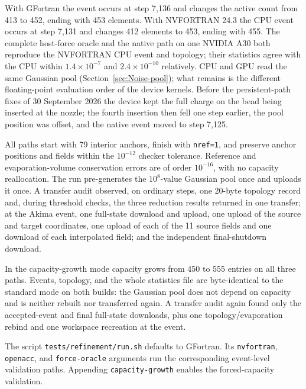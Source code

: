 With GFortran the event occurs at step 7,136 and changes the active count from
413 to 452, ending with 453 elements. With NVFORTRAN 24.3 the CPU event occurs
at step 7,131 and changes 412 elements to 453, ending with 455. The complete
host-force oracle and the native path on one NVIDIA A30 both reproduce the
NVFORTRAN CPU event and topology; their statistics agree with the CPU within
$1.4\times10^{-7}$ and $2.4\times10^{-10}$ relatively.  CPU and GPU read the
same Gaussian pool (Section~\ref{sec:Noise-pool}); what remains is the
different floating-point evaluation order of the device kernels.  Before the persistent-path
fixes of 30 September 2026 the device kept the full charge on the bead being
inserted at the nozzle; the fourth insertion then fell one step earlier, the
pool position was offset, and the native event moved to step 7,125.

All paths start with 79 interior anchors, finish with \texttt{nref=1}, and
preserve anchor positions and fields within the $10^{-12}$ checker tolerance.
Reference and evaporation-volume conservation errors are of order
$10^{-16}$, with no capacity reallocation. The run pre-generates the
$10^{8}$-value Gaussian pool once and uploads it once. A transfer audit
observed, on ordinary steps, one 20-byte topology record and, during
threshold checks, the three reduction results returned in one transfer; at
the Akima event, one full-state download and
upload, one upload of the source and target coordinates, one upload of each
of the 11 source fields and one download of each interpolated field; and the
independent final-shutdown download.

In the capacity-growth mode capacity grows from 450 to 555 entries on all
three paths. Events,
topology, and the whole statistics file are byte-identical to the standard
mode on both builds: the Gaussian pool does not depend on capacity and is
neither rebuilt nor transferred again. A transfer audit again found only the
accepted-event and final full-state downloads, plus one topology/evaporation
rebind and one workspace recreation at the event.

The script \texttt{tests/refinement/run.sh} defaults to GFortran. Its
\texttt{nvfortran}, \texttt{openacc}, and \texttt{force-oracle} arguments run
the corresponding event-level validation paths. Appending
\texttt{capacity-growth} enables the forced-capacity validation.
